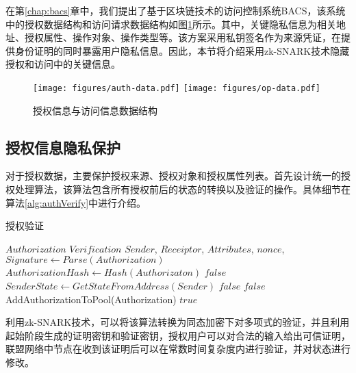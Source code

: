 在第\ref{chap:bacs}章中，我们提出了基于区块链技术的访问控制系统BACS，该系统中的授权数据结构和访问请求数据结构如图\ref{fig:data-structure}所示。其中，关键隐私信息为相关地址、授权属性、操作对象、操作类型等。该方案采用私钥签名作为来源凭证，在提供身份证明的同时暴露用户隐私信息。因此，本节将介绍采用zk-SNARK技术隐藏授权和访问中的关键信息。

\begin{figure}[ht]
  \centering%
    {\texttt{[image: figures/auth-data.pdf]}}%
  \hspace{4em}%
      {\texttt{[image: figures/op-data.pdf]}}
  \caption{授权信息与访问信息数据结构}
  \label{fig:data-structure}
\end{figure}

\subsection{授权信息隐私保护}

对于授权数据，主要保护授权来源、授权对象和授权属性列表。首先设计统一的授权处理算法，该算法包含所有授权前后的状态的转换以及验证的操作。具体细节在算法\ref{alg:authVerify}中进行介绍。

 \begin{algorithm}
 \caption{授权验证}\label{alg:authVerify}
   \begin{algorithmic}[!htbp]
   \renewcommand{\algorithmicrequire}{\textbf{Input:}}
   \renewcommand{\algorithmicensure}{\textbf{Output:}}
   \REQUIRE $Authorization$
   \ENSURE  $Verification$
    \STATE $Sender$, $Receiptor$, $Attributes$, $nonce$, $Signature \gets Parse(Authorization)$
    \STATE $AuthorizationHash \gets Hash(Authorizaton)$
      \RETURN $false$
    \ENDIF
    \STATE $SenderState \gets GetStateFromAddress(Sender)$
      \RETURN $false$
    \ENDIF
        \RETURN $false$
      \ENDIF
    \ENDFOR
    \STATE AddAuthorizationToPool(Authorization)
   \RETURN $true$
   \end{algorithmic}
 \end{algorithm}

利用zk-SNARK技术，可以将该算法转换为同态加密下对多项式的验证，并且利用起始阶段生成的证明密钥和验证密钥，授权用户可以对合法的输入给出可信证明，联盟网络中节点在收到该证明后可以在常数时间复杂度内进行验证，并对状态进行修改。

